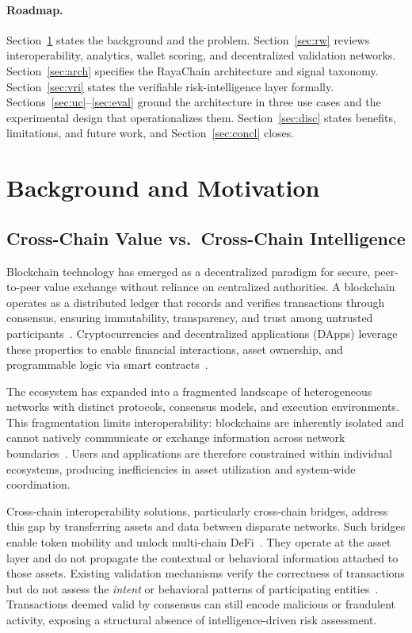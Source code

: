 \documentclass[journal]{IEEEtran}
\begin{document}
\paragraph*{Roadmap.}
Section~\ref{sec:bg} states the background and the problem.
Section~\ref{sec:rw} reviews interoperability, analytics, wallet
scoring, and decentralized validation networks.
Section~\ref{sec:arch} specifies the RayaChain architecture and signal
taxonomy. Section~\ref{sec:vri} states the verifiable
risk-intelligence layer formally. Sections~\ref{sec:uc}--\ref{sec:eval}
ground the architecture in three use cases and the experimental design
that operationalizes them. Section~\ref{sec:disc} states benefits,
limitations, and future work, and Section~\ref{sec:concl} closes.

\section{Background and Motivation}\label{sec:bg}

\subsection{Cross-Chain Value vs.\ Cross-Chain Intelligence}

Blockchain technology has emerged as a decentralized paradigm for
secure, peer-to-peer value exchange without reliance on centralized
authorities. A blockchain operates as a distributed ledger that records
and verifies transactions through consensus, ensuring immutability,
transparency, and trust among untrusted participants~\cite{MukhopadhyaySHO16,
00330023}. Cryptocurrencies and decentralized applications (DApps)
leverage these properties to enable financial interactions, asset
ownership, and programmable logic via smart contracts~\cite{KhanAAA21a}.

The ecosystem has expanded into a fragmented landscape of heterogeneous
networks with distinct protocols, consensus models, and execution
environments. This fragmentation limits interoperability: blockchains
are inherently isolated and cannot natively communicate or exchange
information across network boundaries~\cite{BelchiorVGC22}. Users and
applications are therefore constrained within individual ecosystems,
producing inefficiencies in asset utilization and system-wide
coordination.

Cross-chain interoperability solutions, particularly cross-chain
bridges, address this gap by transferring assets and data between
disparate networks. Such bridges enable token mobility and unlock
multi-chain DeFi~\cite{ZhangZZL24}. They operate at the asset layer
and do not propagate the contextual or behavioral information attached
to those assets. Existing validation mechanisms verify the correctness
of transactions but do not assess the \emph{intent} or behavioral
patterns of participating entities~\cite{bhowmik2021}. Transactions
deemed valid by consensus can still encode malicious or fraudulent
activity, exposing a structural absence of intelligence-driven risk
assessment.
\end{document}
